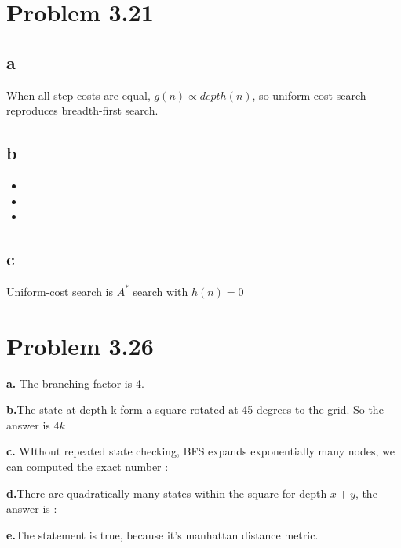 \documentclass[a4paper,left=2.5cm,right=2.5cm,11pt]{article}
\newcommand{\wuhao}{\fontsize{10.5pt}{\baselineskip}\selectfont}    %
\begin{document}
\section{Problem 3.21}
\subsection*{a} When all step costs are equal, $g(n) \propto depth(n)$, so uniform-cost search reproduces breadth-first search.
\subsection*{b} 
\begin{itemize}
	\item  \wuhao{Breadth-first is best-first search with $f(n) = depth(n)$ }
	\item  \wuhao{Depth-first search is best -first search with $f(n)=-depth(n)$ }
	\item \wuhao{Uniform-first search is best-first search with $f(n)=g(n)$}

\end{itemize}
\subsection*{c}
Uniform-cost search is $A^*$ search with $h(n)=0$ 


\section{Problem 3.26}
\textbf{a.}  The branching factor is 4. \par
\textbf{b.}The state at depth k form a square rotated at 45 degrees to the grid. So the answer is $4k$  \par
\textbf{c.} WIthout repeated state checking, BFS expands exponentially many nodes, we can computed the exact number :
\begin{quote}
\end{quote}
\par

\textbf{d.}There are quadratically many states within the square for depth $x+y$, the answer is :
\begin{quote}
\end{quote}
\par

\textbf{e.}The statement is true, because it's manhattan distance metric. \par
\end{document}
